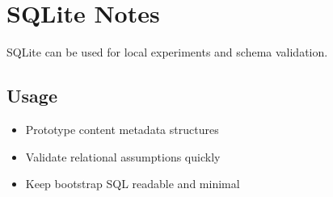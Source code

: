 \section{SQLite Notes}

SQLite can be used for local experiments and schema validation.

\subsection{Usage}
\begin{itemize}
  \item Prototype content metadata structures
  \item Validate relational assumptions quickly
  \item Keep bootstrap SQL readable and minimal
\end{itemize}
